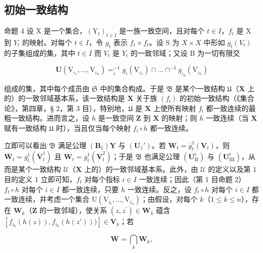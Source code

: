 \subsection{初始一致结构}

命题 4 设 X 是一个集合，\((\mathrm{Y}_{t})_{t\in I}\) 是一族一致空间，且对每个 \(t\in I\)，\(f_{t}\) 是 X 到 \(Y_{t}\) 的映射。对每个 \(t\in I\)，令 \(g_{t}\) 表示 \(f_{t}\times f_{t}\)。设 S 为 \(X\times X\) 中形如 \(\overline{g}_{t}(V_{t})\) 的子集组成的集，其中 \(t\in I\) 而 \(V_{t}\) 是 \(Y_{t}\) 的一致邻域；又设 B 为一切有限交

\[
\mathbf {U} \left(\mathrm{V} _ {\iota_ {1}}, \dots , \mathrm{V} _ {\iota_ {n}}\right) = _ {i} ^ {- 1} g _ {i} \left(\mathrm{V} _ {\iota_ {1}}\right) \cap \dots \cap^ {- 1} g _ {\iota_ {n}} \left(\mathrm{V} _ {\iota_ {n}}\right)\tag{1}
\]

组成的集，其中每个成员由 \(\mathfrak{S}\) 中的集合构成。于是 \(\mathfrak{B}\) 是某个一致结构 \(\mathfrak{U}\)（\(\mathbf{X}\) 上的）的一致邻域基本系，该一致结构是 \(\mathbf{X}\) 关于族 \((f_{\mathfrak{i}})\) 的初始一致结构（《集合论》，第四章，§ 2，第 3 目），特别地，\(\mathfrak{U}\) 是 \(\mathbf{X}\) 上使所有映射 \(f_{\mathfrak{i}}\) 都一致连续的最粗一致结构。进而言之，设 \(h\) 是一致空间 \(\mathbf{Z}\) 到 \(\mathbf{X}\) 的映射；则 \(h\) 一致连续（当 \(\mathbf{X}\) 赋有一致结构 \(\mathfrak{U}\) 时），当且仅当每个映射 \(f_{\mathfrak{i}} \circ h\) 都一致连续。

立即可以看出 \(\mathfrak{B}\) 满足公理 \((\mathbf{B}_1)\mathbf{Y}\) 与 \((\mathbf{U}_1')\)。若 \(\mathbf{W}_t = \overline{g}_t^1 (\mathbf{V}_t)\)，则 \(\overline{\mathbf{W}}_t = \overline{g}_t^1 (\overline{\mathbf{V}}_t^1)\) 且 \(\dot{\mathbf{W}}_t = \overline{g}_t^1 (\overline{\mathbf{V}}_t^2)\)；于是 \(\mathfrak{B}\) 也满足公理 \((\mathbf{U}_{\mathrm{II}}^t)\) 与 \((\mathbf{U}_{\mathrm{III}}^t)\)，从而是某个一致结构 \(\mathcal{U}\)（\(\mathbf{X}\) 上的）的一致邻域基本系。此外，由 \(\mathcal{U}\) 的定义以及第 1 目的定义 1 立即可知，\(f_{t}\) 对每个指标 \(i\in I\) 一致连续；因此（第 1 目命题 2）\(f_{t}\circ h\) 对每个 \(i\in I\) 都一致连续，只要 \(h\) 一致连续。反之，设 \(f_{t}\circ h\) 对每个 \(i\in I\) 都一致连续，并考虑一个集合 \(\mathrm{U}(\mathrm{V}_{i_t},\dots,\mathrm{V}_{i_n})\)；由假设，对每个 \(k\)（\(1\leqslant k\leqslant n\)），存在 \(\mathbf{W}_k\)（\(\mathbf{Z}\) 的一致邻域），使关系 \((z,z^{\prime})\in \mathbf{W}_k\) 蕴含 \([f_{i_k}(h(z)),f_{i_k}(h(z')))]\in \mathbf{V}_k\)；若

\[
\mathbf {W} = \bigcap_ {k} \mathbf {W} _ {k},
\]

